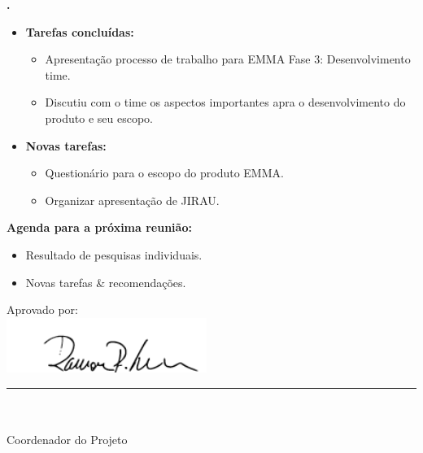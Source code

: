 	
   \textbf{\julia.} 
	\begin{itemize}
		\item \textbf{Tarefas concluídas:}
			\begin{itemize}    
				\item Apresentação processo de trabalho para EMMA Fase 3: Desenvolvimento
				time.
				\item Discutiu com o time os aspectos importantes apra o desenvolvimento do
				produto e seu escopo. 
			\end{itemize}
		
		\item \textbf{Novas tarefas:}
			\begin{itemize} 
			    \item Questionário para o escopo do produto EMMA.
			    \item Organizar apresentação de JIRAU.
			\end{itemize}
	\end{itemize}		



\textbf{Agenda para a próxima reunião:}
  \begin{itemize}
    \item Resultado de pesquisas individuais.
    \item Novas tarefas \& recomendações.
  \end{itemize}


\vspace{5mm}%
\parbox[t]{70mm}{
  Aprovado por: \\[5mm]
  \centering
  \includegraphics[width=65mm]{figs/logo/assinatura-ramon.png} \\[-4mm]
  \rule[2mm]{70mm}{0.1mm} \\
  \ramon \\[1mm]
  Coordenador do Projeto \\
}

\fim